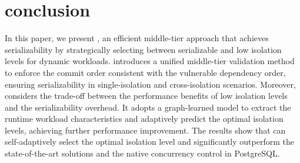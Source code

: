 \section{conclusion}
In this paper, we present \sysname, an efficient middle-tier approach that achieves serializability by strategically selecting between serializable and low isolation levels for dynamic workloads. 
\sysname introduces a unified middle-tier validation method to enforce the commit order consistent with the vulnerable dependency order, ensuring serializability in single-isolation and cross-isolation scenarios. Moreover, \sysname considers the trade-off between the performance benefits of low isolation levels and the serializability overhead. It adopts a graph-learned model to extract the runtime workload characteristics and adaptively predict the optimal isolation levels, achieving further performance improvement. 
The results show that \sysname can self-adaptively select the optimal isolation level and significantly outperform the state-of-the-art solutions and the native concurrency control in PostgreSQL. 


